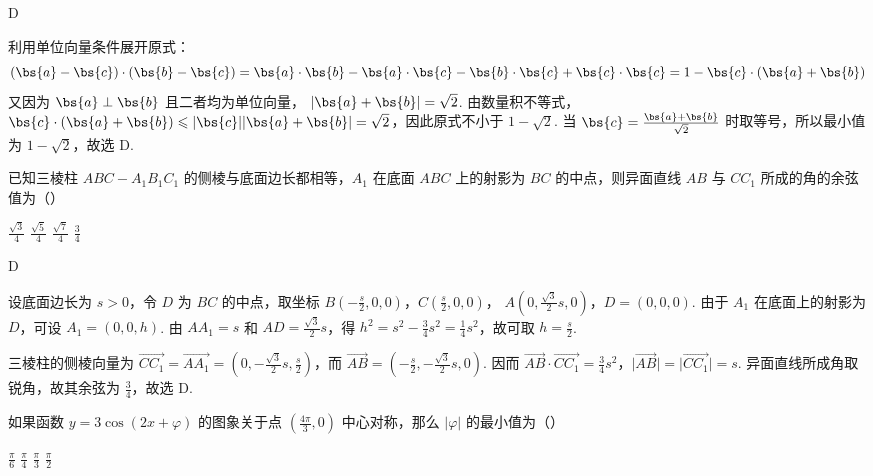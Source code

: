 \begin{answer}
D
\end{answer}

\begin{solution}
利用单位向量条件展开原式：
\[
(\bs{a}-\bs{c})\cdot(\bs{b}-\bs{c})=\bs{a}\cdot\bs{b}-\bs{a}\cdot\bs{c}-\bs{b}\cdot\bs{c}+\bs{c}\cdot\bs{c}=1-\bs{c}\cdot(\bs{a}+\bs{b})
\]
又因为 \(\bs{a}\perp\bs{b}\) 且二者均为单位向量，
\(\lvert\bs{a}+\bs{b}\rvert=\sqrt2\). 由数量积不等式，
\(\bs{c}\cdot(\bs{a}+\bs{b})\leqslant\lvert\bs{c}\rvert\lvert\bs{a}+\bs{b}\rvert=\sqrt2\)，因此原式不小于 \(1-\sqrt2\). 当 \(\bs{c}=\frac{\bs{a}+\bs{b}}{\sqrt2}\) 时取等号，所以最小值为 \(1-\sqrt2\)，故选 D.
\end{solution}

\begin{problem}
已知三棱柱 \(ABC - A_{1}B_{1}C_{1}\) 的侧棱与底面边长都相等，\(A_{1}\) 在底面 \(ABC\) 上的射影为 \(BC\) 的中点，则异面直线 \(AB\) 与 \(CC_{1}\) 所成的角的余弦值为（\quad）

\choices
    {\(\frac{\sqrt{3}}{4}\)}
    {\(\frac{\sqrt{5}}{4}\)}
    {\(\frac{\sqrt{7}}{4}\)}
    {\(\frac{3}{4}\)}
\end{problem}

\begin{answer}
D
\end{answer}

\begin{solution}
设底面边长为 \(s>0\)，令 \(D\) 为 \(BC\) 的中点，取坐标
\(B\left(-\frac{s}{2},0,0\right)\)，\(C\left(\frac{s}{2},0,0\right)\)，
\(A\left(0,\frac{\sqrt3}{2}s,0\right)\)，\(D=(0,0,0)\). 由于 \(A_1\) 在底面上的射影为 \(D\)，可设
\(A_1=\left(0,0,h\right)\). 由 \(AA_1=s\) 和
\(AD=\frac{\sqrt3}{2}s\)，得
\(h^2=s^2-\frac34s^2=\frac14s^2\)，故可取 \(h=\frac{s}{2}\).

三棱柱的侧棱向量为
\(\overrightarrow{CC_1}=\overrightarrow{AA_1}=\left(0,-\frac{\sqrt3}{2}s,\frac{s}{2}\right)\)，而
\(\overrightarrow{AB}=\left(-\frac{s}{2},-\frac{\sqrt3}{2}s,0\right)\). 因而
\(\overrightarrow{AB}\cdot\overrightarrow{CC_1}=\frac34s^2\)，\(\lvert\overrightarrow{AB}\rvert=\lvert\overrightarrow{CC_1}\rvert=s\).
异面直线所成角取锐角，故其余弦为 \(\frac34\)，故选 D.
\end{solution}

\begin{problem}
如果函数 \( y = 3\cos\left(2x + \varphi\right) \) 的图象关于点 \( \left(\frac{4\pi}{3}, 0\right) \) 中心对称，那么 \( |\varphi| \) 的最小值为（\quad）

\choices
    {\( \frac{\pi}{6} \)}
    {\( \frac{\pi}{4} \)}
    {\( \frac{\pi}{3} \)}
    {\( \frac{\pi}{2} \)}
\end{problem}

